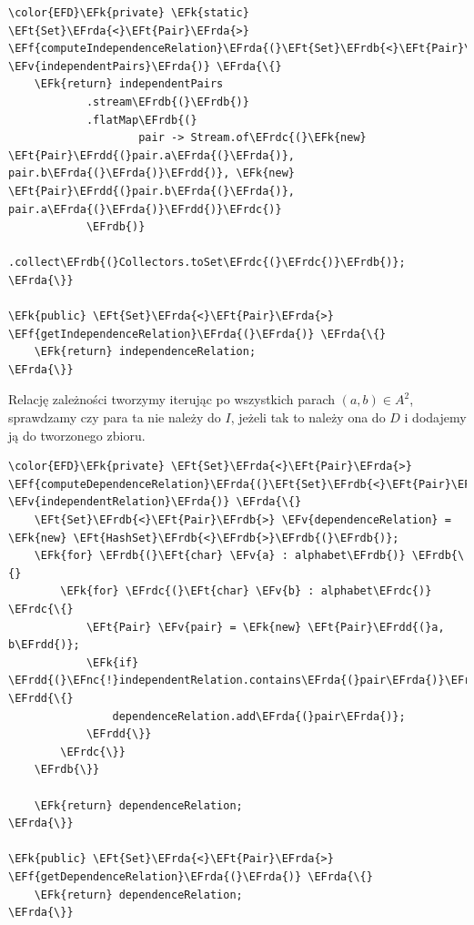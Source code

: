 \documentclass[11pt]{article}
\newcommand{\EFk}[1]{\textcolor{EFk}{#1}} %
\newcommand{\EFf}[1]{\textcolor{EFf}{#1}} %
\newcommand{\EFv}[1]{\textcolor{EFv}{#1}} %
\newcommand{\EFt}[1]{\textcolor{EFt}{#1}} %
\newcommand{\EFnc}[1]{\textcolor{EFnc}{\textbf{#1}}} %
\newcommand{\EFrda}[1]{#1} %
\newcommand{\EFrdb}[1]{\textcolor{EFrdb}{#1}} %
\newcommand{\EFrdc}[1]{\textcolor{EFrdc}{#1}} %
\newcommand{\EFrdd}[1]{\textcolor{EFrdd}{#1}} %
\begin{document}
\begin{Code}
\begin{Verbatim}
\color{EFD}\EFk{private} \EFk{static} \EFt{Set}\EFrda{<}\EFt{Pair}\EFrda{>} \EFf{computeIndependenceRelation}\EFrda{(}\EFt{Set}\EFrdb{<}\EFt{Pair}\EFrdb{>} \EFv{independentPairs}\EFrda{)} \EFrda{\{}
    \EFk{return} independentPairs
            .stream\EFrdb{(}\EFrdb{)}
            .flatMap\EFrdb{(}
                    pair -> Stream.of\EFrdc{(}\EFk{new} \EFt{Pair}\EFrdd{(}pair.a\EFrda{(}\EFrda{)}, pair.b\EFrda{(}\EFrda{)}\EFrdd{)}, \EFk{new} \EFt{Pair}\EFrdd{(}pair.b\EFrda{(}\EFrda{)}, pair.a\EFrda{(}\EFrda{)}\EFrdd{)}\EFrdc{)}
            \EFrdb{)}
            .collect\EFrdb{(}Collectors.toSet\EFrdc{(}\EFrdc{)}\EFrdb{)};
\EFrda{\}}

\EFk{public} \EFt{Set}\EFrda{<}\EFt{Pair}\EFrda{>} \EFf{getIndependenceRelation}\EFrda{(}\EFrda{)} \EFrda{\{}
    \EFk{return} independenceRelation;
\EFrda{\}}
\end{Verbatim}
\end{Code}

Relację zależności tworzymy iterując po wszystkich parach \((a,b) \in A^2\), sprawdzamy
czy para ta nie należy do \(I\), jeżeli tak to należy ona do \(D\) i dodajemy ją do tworzonego zbioru.

\begin{Code}
\begin{Verbatim}
\color{EFD}\EFk{private} \EFt{Set}\EFrda{<}\EFt{Pair}\EFrda{>} \EFf{computeDependenceRelation}\EFrda{(}\EFt{Set}\EFrdb{<}\EFt{Pair}\EFrdb{>} \EFv{independentRelation}\EFrda{)} \EFrda{\{}
    \EFt{Set}\EFrdb{<}\EFt{Pair}\EFrdb{>} \EFv{dependenceRelation} = \EFk{new} \EFt{HashSet}\EFrdb{<}\EFrdb{>}\EFrdb{(}\EFrdb{)};
    \EFk{for} \EFrdb{(}\EFt{char} \EFv{a} : alphabet\EFrdb{)} \EFrdb{\{}
        \EFk{for} \EFrdc{(}\EFt{char} \EFv{b} : alphabet\EFrdc{)} \EFrdc{\{}
            \EFt{Pair} \EFv{pair} = \EFk{new} \EFt{Pair}\EFrdd{(}a, b\EFrdd{)};
            \EFk{if} \EFrdd{(}\EFnc{!}independentRelation.contains\EFrda{(}pair\EFrda{)}\EFrdd{)} \EFrdd{\{}
                dependenceRelation.add\EFrda{(}pair\EFrda{)};
            \EFrdd{\}}
        \EFrdc{\}}
    \EFrdb{\}}

    \EFk{return} dependenceRelation;
\EFrda{\}}

\EFk{public} \EFt{Set}\EFrda{<}\EFt{Pair}\EFrda{>} \EFf{getDependenceRelation}\EFrda{(}\EFrda{)} \EFrda{\{}
    \EFk{return} dependenceRelation;
\EFrda{\}}
\end{Verbatim}
\end{Code}
\end{document}
